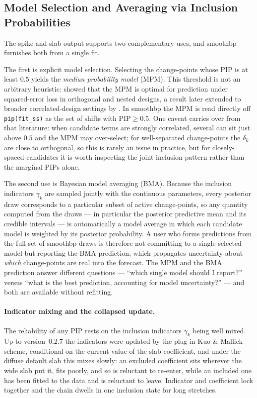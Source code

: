\documentclass[12pt]{article}
\newcommand{\pkg}[1]{\textsf{#1}}
\newcommand{\code}[1]{\texttt{#1}}
\begin{document}
\subsection{Model Selection and Averaging via Inclusion Probabilities}
\label{sec:pip}

The spike-and-slab output supports two complementary uses, and \pkg{smoothbp} furnishes both from a single fit.

The first is explicit model selection. Selecting the change-points whose PIP is at least $0.5$ yields the \emph{median probability model} (MPM). This threshold is not an arbitrary heuristic: \citet{barbieriberger2004} showed that the MPM is optimal for prediction under squared-error loss in orthogonal and nested designs, a result later extended to broader correlated-design settings by \citet{barbieri2021}. In \pkg{smoothbp} the MPM is read directly off \code{pip(fit\_ss)} as the set of shifts with $\text{PIP} \ge 0.5$. One caveat carries over from that literature: when candidate terms are strongly correlated, several can sit just above $0.5$ and the MPM may over-select; for well-separated change-points the $\delta_k$ are close to orthogonal, so this is rarely an issue in practice, but for closely-spaced candidates it is worth inspecting the joint inclusion pattern rather than the marginal PIPs alone.

The second use is Bayesian model averaging (BMA). Because the inclusion indicators $\gamma_k$ are sampled jointly with the continuous parameters, every posterior draw corresponds to a particular subset of active change-points, so any quantity computed from the draws --- in particular the posterior predictive mean and its credible intervals --- is automatically a model average in which each candidate model is weighted by its posterior probability. A user who forms predictions from the full set of \pkg{smoothbp} draws is therefore not committing to a single selected model but reporting the BMA prediction, which propagates uncertainty about \emph{which} change-points are real into the forecast. The MPM and the BMA prediction answer different questions --- ``which single model should I report?'' versus ``what is the best prediction, accounting for model uncertainty?'' --- and both are available without refitting.

\paragraph{Indicator mixing and the collapsed update.} The reliability of any PIP rests on the inclusion indicators $\gamma_k$ being well mixed. Up to version~0.2.7 the indicators were updated by the plug-in Kuo \& Mallick scheme, conditional on the current value of the slab coefficient, and under the diffuse default slab this mixes slowly: an excluded coefficient sits wherever the wide slab put it, fits poorly, and so is reluctant to re-enter, while an included one has been fitted to the data and is reluctant to leave. Indicator and coefficient lock together and the chain dwells in one inclusion state for long stretches.
\end{document}
